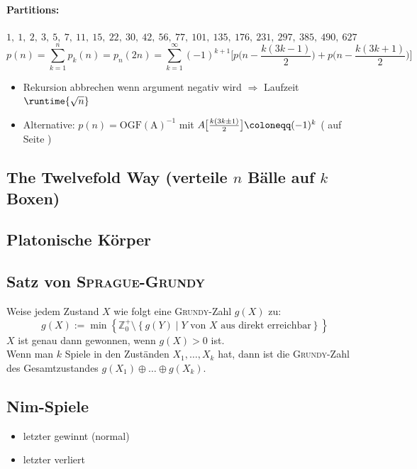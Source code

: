 \paragraph{Partitions:}
$1,~1,~2,~3,~5,~7,~11,~15,~22,~30,~42,~56,~77,~101,~135,~176,~231,~297,~385,~490,~627$
\[p(n)=\sum_{k=1}^{n} p_k(n)=p_n(2n)=\sum\limits_{k=1}^\infty(-1)^{k+1}\bigg[p\bigg(n - \frac{k(3k-1)}{2}\bigg) + p\bigg(n - \frac{k(3k+1)}{2}\bigg)\bigg]\]
\begin{itemize}
	\item Rekursion abbrechen wenn argument negativ wird $\Longrightarrow$ Laufzeit $\runtime{\sqrt{n}}$
	\item Alternative: $p(n) = \mathrm{OGF(A)}^{-1}$ mit $A\mkern-1mu\big[\frac{k(3k\pm1)}{2}\big]\coloneqq(-1)^k$  ( auf Seite \pageref{code:math/transforms/seriesOperations.cpp})
\end{itemize}

\subsection{The Twelvefold Way \textnormal{(verteile $n$ Bälle auf $k$ Boxen)}}


\subsection{Platonische Körper}




\subsection{Satz von \textsc{Sprague-Grundy}}
Weise jedem Zustand $X$ wie folgt eine \textsc{Grundy}-Zahl $g\left(X\right)$ zu:
\[
g\left(X\right) := \min\left\{
\mathbb{Z}_0^+ \setminus
\left\{g\left(Y\right) \mid Y \text{ von } X \text{ aus direkt erreichbar}\right\}
\right\}
\]
$X$ ist genau dann gewonnen, wenn $g\left(X\right) > 0$ ist.\\
Wenn man $k$ Spiele in den Zuständen $X_1, \ldots, X_k$ hat, dann ist die \textsc{Grundy}-Zahl des Gesamtzustandes $g\left(X_1\right) \oplus \ldots \oplus g\left(X_k\right)$.
\vfill\null\columnbreak
\subsection{Nim-Spiele}
\begin{itemize}
	\item[\ding{182}] letzter gewinnt (normal)
	\item[\ding{183}] letzter verliert
\end{itemize}


